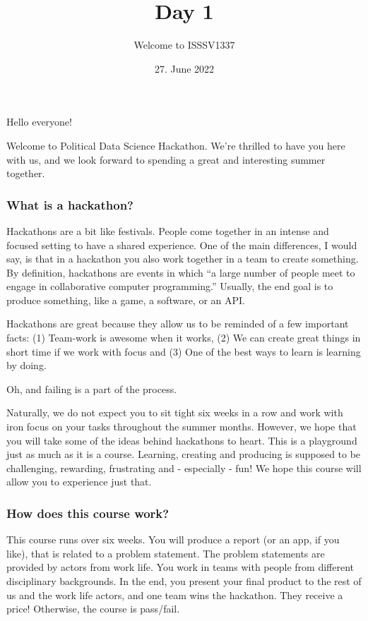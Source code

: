 \documentclass[
]{article}
\title{Day 1}
\subtitle{Welcome to ISSSV1337}
\author{}
\date{\vspace{-2.5em}27. June 2022}
\begin{document}
\maketitle

Hello everyone!

Welcome to Political Data Science Hackathon. We're thrilled to have you
here with us, and we look forward to spending a great and interesting
summer together.

\hypertarget{what-is-a-hackathon}{%
\subsubsection{What is a hackathon?}\label{what-is-a-hackathon}}

Hackathons are a bit like festivals. People come together in an intense
and focused setting to have a shared experience. One of the main
differences, I would say, is that in a hackathon you also work together
in a team to create something. By definition, hackathons are events in
which ``a large number of people meet to engage in collaborative
computer programming.'' Usually, the end goal is to produce something,
like a game, a software, or an API.

Hackathons are great because they allow us to be reminded of a few
important facts: (1) Team-work is awesome when it works, (2) We can
create great things in short time if we work with focus and (3) One of
the best ways to learn is learning by doing.

Oh, and failing is a part of the process.

Naturally, we do not expect you to sit tight six weeks in a row and work
with iron focus on your tasks throughout the summer months. However, we
hope that you will take some of the ideas behind hackathons to heart.
This is a playground just as much as it is a course. Learning, creating
and producing is supposed to be challenging, rewarding, frustrating and
- especially - fun! We hope this course will allow you to experience
just that.

\hypertarget{how-does-this-course-work}{%
\subsubsection{How does this course
work?}\label{how-does-this-course-work}}

This course runs over six weeks. You will produce a report (or an app,
if you like), that is related to a problem statement. The problem
statements are provided by actors from work life. You work in teams with
people from different disciplinary backgrounds. In the end, you present
your final product to the rest of us and the work life actors, and one
team wins the hackathon. They receive a price! Otherwise, the course is
pass/fail.
\end{document}
